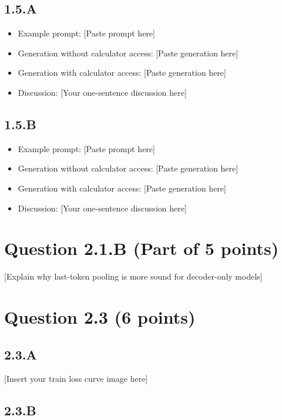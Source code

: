 \documentclass{article}
\begin{document}
\subsection*{1.5.A}

\begin{itemize}
    \item Example prompt: [Paste prompt here]
    \item Generation without calculator access: [Paste generation here]
    \item Generation with calculator access: [Paste generation here]
    \item Discussion: [Your one-sentence discussion here]
\end{itemize}

\subsection*{1.5.B}

\begin{itemize}
    \item Example prompt: [Paste prompt here]
    \item Generation without calculator access: [Paste generation here]
    \item Generation with calculator access: [Paste generation here]
    \item Discussion: [Your one-sentence discussion here]
\end{itemize}

\section*{Question 2.1.B (Part of 5 points)}

[Explain why last-token pooling is more sound for decoder-only models]

\section*{Question 2.3 (6 points)}

\subsection*{2.3.A}

[Insert your train loss curve image here]

\subsection*{2.3.B}
\end{document}

